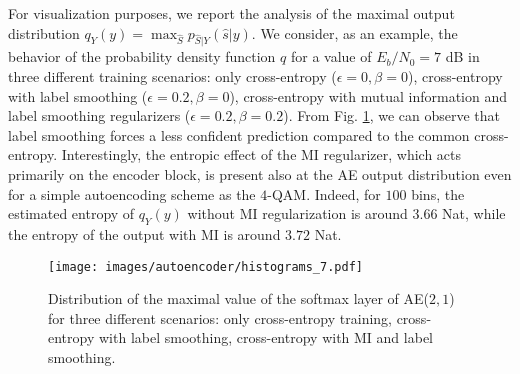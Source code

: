 For visualization purposes, we report the analysis of the maximal output distribution $q_{Y}(y) = \max_{\hat{S}} p_{\hat{S}|Y}(\hat{s}|y)$. We consider, as an example, the behavior of the probability density function $q$ for a value of $E_b/N_0=7$ dB in three different training scenarios: only cross-entropy ($\epsilon = 0, \beta=0$), cross-entropy with label smoothing ($\epsilon = 0.2, \beta=0$), cross-entropy with mutual information and label smoothing regularizers ($\epsilon = 0.2, \beta=0.2$). From Fig. \ref{fig:AE_histograms}, we can observe that label smoothing forces a less confident prediction compared to the common cross-entropy. Interestingly, the entropic effect of the MI regularizer, which acts primarily on the encoder block, is present also at the AE output distribution even for a simple autoencoding scheme as the $4$-QAM. Indeed, for $100$ bins, the estimated entropy of $q_Y(y)$ without MI regularization is around $3.66$ Nat, while the entropy of the output with MI is around $3.72$ Nat. 

\begin{figure}
	\centering
	\texttt{[image: images/autoencoder/histograms\_7.pdf]}
	\caption{Distribution of the maximal value of the softmax layer of AE($2,1$) for three different scenarios: only cross-entropy training, cross-entropy with label smoothing, cross-entropy with MI and label smoothing.}
	\label{fig:AE_histograms}
\end{figure}

